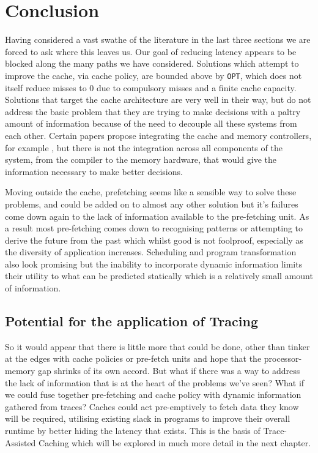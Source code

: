 \section{Conclusion}

Having considered a vast swathe of the literature in the last three sections we are forced to ask where this leaves us. Our goal of reducing latency appears to be blocked along the many paths we have considered. Solutions which attempt to improve the cache, via cache policy, are bounded above by \texttt{OPT}, which does not itself reduce misses to 0 due to compulsory misses and a finite cache capacity. Solutions that target the cache architecture are very well in their way, but do not address the basic problem that they are trying to make decisions with a paltry amount of information because of the need to decouple all these systems from each other. Certain papers propose integrating the cache and memory controllers, for example \cite{stuecheliCoordinatingDRAMLastLevelCache2011}, but there is not the integration across all components of the system, from the compiler to the memory hardware, that would give the information necessary to make better decisions.

Moving outside the cache, prefetching seems like a sensible way to solve these problems, and could be added on to almost any other solution but it's failures come down again to the lack of information available to the pre-fetching unit. As a result most pre-fetching comes down to recognising patterns or attempting to derive the future from the past which whilst good is not foolproof, especially as the diversity of application increases. Scheduling and program transformation also look promising but the inability to incorporate dynamic information limits their utility to what can be predicted statically which is a relatively small amount of information. 

\subsection{Potential for the application of Tracing}

So it would appear that there is little more that could be done, other than tinker at the edges with cache policies or pre-fetch units and hope that the processor-memory gap shrinks of its own accord. But what if there was a way to address the lack of information that is at the heart of the problems we've seen? What if we could fuse together pre-fetching and cache policy with dynamic information gathered from traces? Caches could act pre-emptively to fetch data they know will be required, utilising existing slack in programs to improve their overall runtime by better hiding the latency that exists. This is the basis of Trace-Assisted Caching which will be explored in much more detail in the next chapter. 

